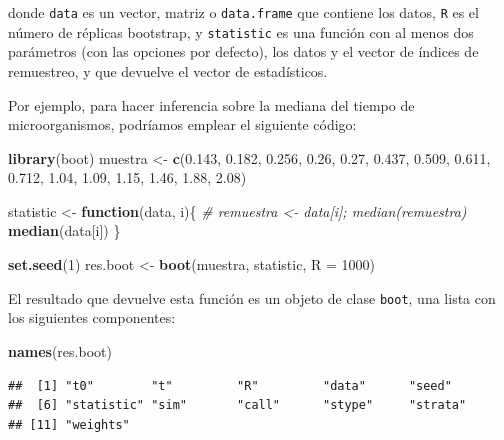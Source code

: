 \documentclass[]{book}
\newenvironment{Shaded}{\begin{snugshade}}{\end{snugshade}}
\newcommand{\KeywordTok}[1]{\textcolor[rgb]{0.13,0.29,0.53}{\textbf{#1}}}
\newcommand{\DataTypeTok}[1]{\textcolor[rgb]{0.13,0.29,0.53}{#1}}
\newcommand{\DecValTok}[1]{\textcolor[rgb]{0.00,0.00,0.81}{#1}}
\newcommand{\FloatTok}[1]{\textcolor[rgb]{0.00,0.00,0.81}{#1}}
\newcommand{\StringTok}[1]{\textcolor[rgb]{0.31,0.60,0.02}{#1}}
\newcommand{\CommentTok}[1]{\textcolor[rgb]{0.56,0.35,0.01}{\textit{#1}}}
\newcommand{\ControlFlowTok}[1]{\textcolor[rgb]{0.13,0.29,0.53}{\textbf{#1}}}
\newcommand{\NormalTok}[1]{#1}
\theoremstyle{definition}
\theoremstyle{definition}
\theoremstyle{definition}
\theoremstyle{remark}
\begin{document}
donde \texttt{data} es un vector, matriz o \texttt{data.frame} que
contiene los datos, \texttt{R} es el número de réplicas bootstrap, y
\texttt{statistic} es una función con al menos dos parámetros (con las
opciones por defecto), los datos y el vector de índices de remuestreo, y
que devuelve el vector de estadísticos.

Por ejemplo, para hacer inferencia sobre la mediana del tiempo de
microorganismos, podríamos emplear el siguiente código:

\begin{Shaded}
\begin{Highlighting}[]
\KeywordTok{library}\NormalTok{(boot)}
\NormalTok{muestra <-}\StringTok{ }\KeywordTok{c}\NormalTok{(}\FloatTok{0.143}\NormalTok{, }\FloatTok{0.182}\NormalTok{, }\FloatTok{0.256}\NormalTok{, }\FloatTok{0.26}\NormalTok{, }\FloatTok{0.27}\NormalTok{, }\FloatTok{0.437}\NormalTok{, }\FloatTok{0.509}\NormalTok{, }
             \FloatTok{0.611}\NormalTok{, }\FloatTok{0.712}\NormalTok{, }\FloatTok{1.04}\NormalTok{, }\FloatTok{1.09}\NormalTok{, }\FloatTok{1.15}\NormalTok{, }\FloatTok{1.46}\NormalTok{, }\FloatTok{1.88}\NormalTok{, }\FloatTok{2.08}\NormalTok{)}

\NormalTok{statistic <-}\StringTok{ }\ControlFlowTok{function}\NormalTok{(data, i)\{}
  \CommentTok{# remuestra <- data[i]; median(remuestra)}
  \KeywordTok{median}\NormalTok{(data[i])}
\NormalTok{\}}

\KeywordTok{set.seed}\NormalTok{(}\DecValTok{1}\NormalTok{)}
\NormalTok{res.boot <-}\StringTok{ }\KeywordTok{boot}\NormalTok{(muestra, statistic, }\DataTypeTok{R =} \DecValTok{1000}\NormalTok{)}
\end{Highlighting}
\end{Shaded}

El resultado que devuelve esta función es un objeto de clase
\texttt{boot}, una lista con los siguientes componentes:

\begin{Shaded}
\begin{Highlighting}[]
\KeywordTok{names}\NormalTok{(res.boot)}
\end{Highlighting}
\end{Shaded}

\begin{verbatim}
##  [1] "t0"        "t"         "R"         "data"      "seed"     
##  [6] "statistic" "sim"       "call"      "stype"     "strata"   
## [11] "weights"
\end{verbatim}
\end{document}
